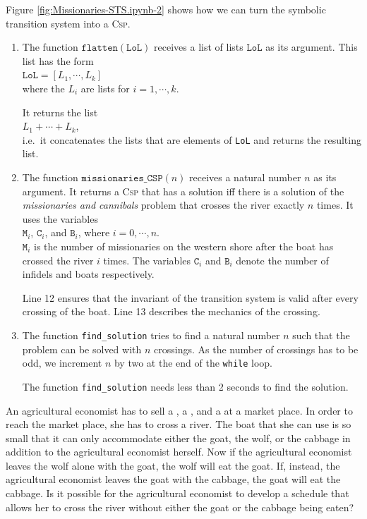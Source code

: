 Figure \ref{fig:Missionaries-STS.ipynb-2} shows how we can turn the symbolic transition system into a
\textsc{Csp}.
\begin{enumerate}
\item The function $\texttt{flatten}(\texttt{LoL})$ receives a list of lists $\texttt{LoL}$ as its argument.
       This list has the form
       \\[0.2cm]
       \hspace*{1.3cm}
       $\texttt{LoL} = [L_1, \cdots, L_k]$
       \\[0.2cm]
       where the $L_i$ are lists for $i=1,\cdots,k$.
       
       It returns the list
       \\[0.2cm]
       \hspace*{1.3cm}
       $L_1 + \cdots + L_k$,
       \\[0.2cm]
       i.e.~it concatenates the lists that are elements of \texttt{LoL} and returns the resulting list.
\item The function $\mathtt{missionaries\_CSP}(n)$ receives a natural number $n$ as its argument.
       It returns a \textsc{Csp} that has a solution iff there is a solution of the \emph{missionaries and cannibals}
       problem that crosses the river exactly $n$ times.  It uses the variables
       \\[0.2cm]
       \hspace*{1.3cm}
       $\mathtt{M}_i$, $\mathtt{C}_i$, and $\mathtt{B}_i$, where $i=0,\cdots,n$.
       \\[0.2cm]
       $\mathtt{M}_i$ is the number of missionaries on the western shore after the boat has crossed the river
       $i$ times. The variables $\mathtt{C}_i$ and $\texttt{B}_i$ denote the number of infidels and boats
       respectively.

       Line 12 ensures that the invariant of the transition system is valid after every crossing of the boat.
       Line 13 describes the mechanics of the crossing.
\item The function \texttt{find\_solution} tries to find a natural number $n$ such that the problem can be solved
       with $n$ crossings. As the number of crossings has to be odd, we increment $n$ by
       two at the end of the \texttt{while} loop.

       The function \texttt{find\_solution} needs less than 2 seconds to find the solution.
\end{enumerate}

\exerciseEng
An agricultural economist has to sell a , a , and a 
at a market place.  In order to reach the market place, she has to cross a river.  The
boat that she can use is so small that it can only accommodate either the goat, the wolf,
or the cabbage in addition to the agricultural economist herself.  Now if the agricultural
economist leaves the wolf alone with the goat, the wolf will eat the goat.  If, instead,
the agricultural economist leaves the goat with the cabbage, the goat will eat the
cabbage.  Is it possible for the agricultural economist to develop a schedule that allows
her to cross the river without either the goat or the cabbage being eaten?

